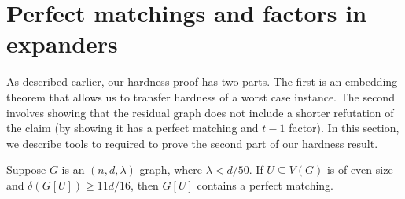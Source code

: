 \documentclass[11pt]{article}
\begin{document}




\section{Perfect matchings and factors in expanders}
\label{sec:matching-machinery}
As described earlier, our hardness proof has two parts.
The first is an embedding theorem that allows us to transfer hardness of a worst case instance.
The second involves showing that the residual graph does not include a shorter refutation of the claim (by showing it has a perfect matching and $t-1$ factor).
In this section, we describe tools to required to prove the second part of our hardness result.

\begin{lemma}\label{thm:perfect-matching}
Suppose $G$ is an $(n, d, \lambda)$-graph, where $\lambda < d/50$. If $U \subseteq V(G)$ is of even size and $\delta(G[U]) \ge 11d/16$, then $G[U]$ contains a perfect matching.
\end{lemma}
\end{document}
